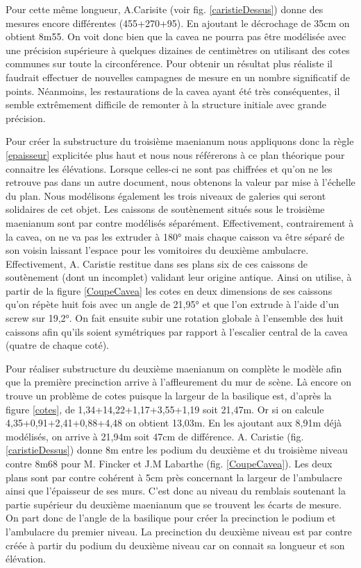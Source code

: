 Pour cette même longueur, A.Carisite (voir fig. \ref{caristieDessus}) donne des mesures encore différentes (455+270+95). En ajoutant le décrochage de 35cm on obtient 8m55. On voit donc bien que la cavea ne pourra pas être modélisée avec une précision supérieure à quelques dizaines de centimètres on utilisant des cotes communes sur toute la circonférence. Pour obtenir un résultat plus réaliste il faudrait effectuer de nouvelles campagnes de mesure en un nombre significatif de points. Néanmoins, les restaurations de la cavea ayant été très conséquentes, il semble extrêmement difficile de remonter à la structure initiale avec grande précision.

Pour créer la substructure du troisième maenianum nous appliquons donc la règle \ref{epaisseur} explicitée plus haut et nous nous référerons à ce plan théorique pour connaitre les élévations. Lorsque celles-ci ne sont pas chiffrées et qu'on ne les retrouve pas dans un autre document, nous obtenons la valeur par mise à l'échelle du plan. Nous modélisons également les trois niveaux de galeries qui seront solidaires de cet objet. Les caissons de soutènement situés sous le troisième \gls{maenianum} sont par contre modélisés séparément. Effectivement, contrairement à la cavea, on ne va pas les extruder à 180° mais chaque caisson va être séparé de son voisin laissant l'espace pour les vomitoires du deuxième ambulacre. Effectivement, A. Caristie restitue dans ses plans six de ces caissons de soutènement (dont un incomplet) validant leur origine antique. Ainsi on utilise, à partir de la figure \ref{CoupeCavea} les cotes en deux dimensions de ses caissons qu'on répète huit fois avec un angle de 21,95° et que l'on extrude à l'aide d'un \gls{screw} sur 19,2°. On fait ensuite subir une rotation globale à l'ensemble des huit caissons afin qu'ils soient symétriques par rapport à l'escalier central de la cavea (quatre de chaque coté). 

Pour réaliser substructure du deuxième maenianum on complète le modèle afin que la première precinction arrive à l'affleurement du mur de scène. Là encore on trouve un problème de cotes puisque la largeur de la basilique est, d'après la figure \ref{cotes}, de 1,34+14,22+1,17+3,55+1,19 soit 21,47m. Or si on calcule 4,35+0,91+2,41+0,88+4,48 on obtient 13,03m. En les ajoutant aux 8,91m déjà modélisés, on arrive à 21,94m soit 47cm de différence. A. Caristie (fig. \ref{caristieDessus}) donne 8m entre les podium du deuxième et du troisième niveau contre 8m68 pour M. Fincker et J.M Labarthe (fig. \ref{CoupeCavea}). Les deux plans sont par contre cohérent à 5cm près concernant la largeur de l'ambulacre ainsi que l'épaisseur de ses murs. C'est donc au niveau du remblais soutenant la partie supérieur du deuxième maenianum que se trouvent les écarts de mesure. On part donc de l'angle de la basilique pour créer la precinction le podium et l'ambulacre du premier niveau. La precinction du deuxième niveau est par contre créée à partir du podium du deuxième niveau car on connait sa longueur et son élévation. 

